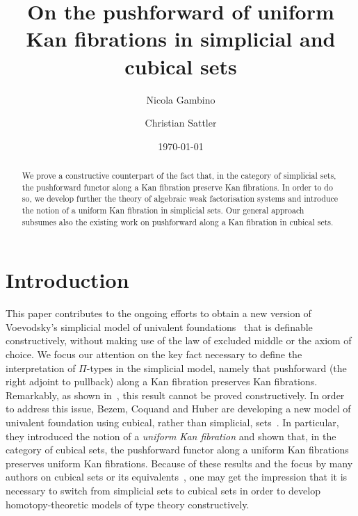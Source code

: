 \documentclass[reqno,10pt,a4paper,oneside]{amsart}
\title{On the pushforward of uniform Kan fibrations in simplicial and cubical sets}
\begin{document}
\begin{abstract}
We prove a  constructive counterpart of the fact that,
in the category of simplicial sets, the pushforward functor along a Kan fibration preserve Kan fibrations. 
In order to do so, we develop further the theory of algebraic weak factorisation systems and 
 introduce the notion of a uniform Kan fibration in simplicial sets. Our
general approach subsumes also the existing work on pushforward along
a Kan fibration in cubical sets.
\end{abstract}

\author{Nicola Gambino}
\address{School of Mathematics, University of Leeds, Leeds LS2 9JT, UK}

\author{Christian Sattler}
\address{School of Mathematics, University of Leeds, Leeds LS2 9JT, UK}

\date{\today}

\maketitle

\tableofcontents


\section{Introduction}

This paper contributes to the ongoing efforts to obtain a new version of Voevodsky's simplicial model of univalent foundations~\cite{voevodsky-simplicial-model} that is  definable constructively, \ie without making use of the law of excluded middle or the axiom of choice. We focus our attention on the key fact necessary to define the interpretation of $\Pi$-types in the simplicial model, namely that pushforward (\ie the right adjoint to pullback) along a Kan fibration preserves Kan fibrations. Remarkably, as shown in~\cite{coquand-non-constructivity-kan},  this result cannot be proved constructively.
In order to address this issue, Bezem, Coquand and Huber are developing a new model of 
univalent foundation using cubical, rather than simplicial, sets~\cite{coquand-cubical-sets,coquand-variation,huber-thesis}. In particular, they introduced the notion of a \emph{uniform Kan fibration} and shown that, in the category of cubical sets,  
the pushforward functor along a uniform Kan fibrations preserves uniform Kan fibrations. Because of these results and the focus by many
authors on cubical sets or its equivalents~\cite{awodey-cubical,pitts-cubical-nominal,swan-awfs}, one may get the impression that it is necessary to switch from simplicial sets to cubical sets in order to develop homotopy-theoretic models of type theory constructively.
\end{document}
